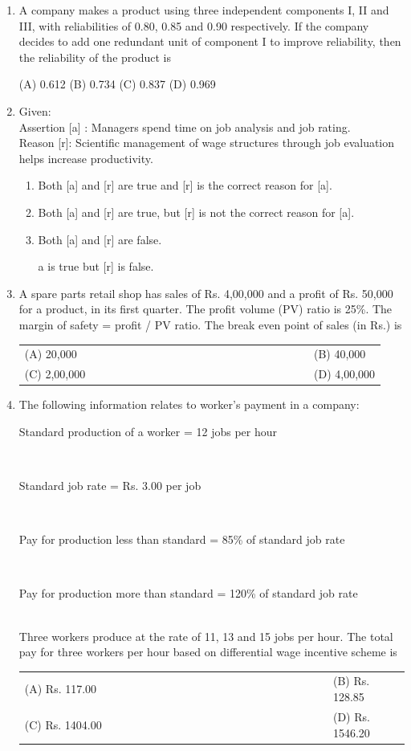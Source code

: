 \documentclass[a4paper,12pt]{article}
\begin{document}
\begin{enumerate}[label=Q.\arabic*, leftmargin=*]
\item A company makes a product using three independent components I, II and III, with reliabilities of 0.80, 0.85 and 0.90 respectively. If the company decides to add one redundant unit of component I to improve reliability, then the reliability of the product is

(A) 0.612 \hfill (B) 0.734 \hfill (C) 0.837 \hfill (D) 0.969 

\item Given: \\
Assertion [a] : Managers spend time on job analysis and job rating.\\
Reason [r]: Scientific management of wage structures through job evaluation helps increase productivity.
\begin{enumerate}[label=(\Alph*)]
\item Both [a] and [r] are true and [r] is the correct reason for [a].
\item Both [a] and [r] are true, but [r] is not the correct reason for [a].
\item Both [a] and [r] are false. 
\item [a] is true but [r] is false.
\end{enumerate}

\item A spare parts retail shop has sales of Rs. 4,00,000 and a profit of Rs. 50,000 for a product, in its first quarter. The profit volume (PV) ratio is 25\%. The margin of safety = profit / PV ratio. The break even point of sales (in Rs.) is
\begin{multicols}{2}
\begin{tabular}[t]{p{0.8\linewidth} p{0.9\linewidth}}
(A) 20,000 & (B) 40,000 \\
(C) 2,00,000 & (D) 4,00,000 \\
\end{tabular}
\end{multicols}

\item The following information relates to worker's payment in a company: \\
\centerline{Standard production of a worker = 12 jobs per hour} \\
\centerline{Standard job rate = Rs. 3.00 per job}\\
\centerline{Pay for production less than standard = 85\% of standard job rate}\\
\centerline{Pay for production more than standard = 120\% of standard job rate} \\
Three workers produce at the rate of 11, 13 and 15 jobs per hour. The total pay for three workers per hour based on differential wage incentive scheme is
\begin{multicols}{2}
\begin{tabular}[t]{p{0.8\linewidth} p{0.9\linewidth}}
(A) Rs. 117.00 & (B) Rs. 128.85 \\
(C) Rs. 1404.00 & (D) Rs. 1546.20 \\
\end{tabular}
\end{multicols}


\end{enumerate}
\end{document}
